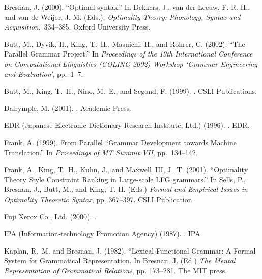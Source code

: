 \documentclass[english]{jnlp_1.4_rep}
\begin{document}
\begin{thebibliography}{}

Bresnan, J. (2000).
\newblock ``Optimal syntax.'' 
\newblock In Dekkers, J., van der Leeuw, F. R. H., and van de Weijer, J. M. (Eds.), \textit{Optimality Theory: Phonology, Syntax and
Acquisition},\ 334--385.
  Oxford University Press.

Butt, M., Dyvik, H., King, T.~H., Masuichi, H., and Rohrer, C. (2002). 
\newblock ``The Parallel Grammar Project.'' 
\newblock In {\em Proceedings of the 19th International Conference on
  Computational Linguistics (COLING 2002) Workshop `Grammar Engineering and
  Evaluation'}, pp.~1--7.

Butt, M., King, T.~H., Nino, M.~E., and Segond, F. (1999). 
.
\newblock CSLI Publications.

Dalrymple, M. (2001). 
.
\newblock Academic Press.

EDR (Japanese Electronic Dictionary Research Institute, Ltd.) (1996). 
.
\newblock EDR.

Frank, A. (1999). 
\newblock From Parallel ``Grammar Development towards Machine
  Translation.'' 
\newblock In {\em Proceedings of MT Summit VII}, pp.~134--142.

Frank, A., King, T.~H., Kuhn, J., and Maxwell~III, J.~T.
(2001). 
\newblock ``Optimality Theory Style Constraint Ranking in Large-scale LFG grammars.''  
\newblock In Sells, P., Bresnan, J., Butt, M., and King, T. H. (Eds.) 
{\em Formal and Empirical Issues in Optimality Theoretic Syntax}, pp. 367--397.
CSLI Publication.

Fuji Xerox Co., Ltd. (2000).
.

IPA (Information-technology Promotion Agency) (1987).
.
\newblock IPA.

Kaplan, R.~M. and Bresnan, J. (1982).
\newblock ``Lexical-Functional Grammar: A Formal System for Grammatical
  Representation. 
\newblock In Bresnan, J. (Ed.) {\em The Mental Representation of Grammatical Relations}, pp. 173--281. The MIT press.


\end{thebibliography}
\end{document}
